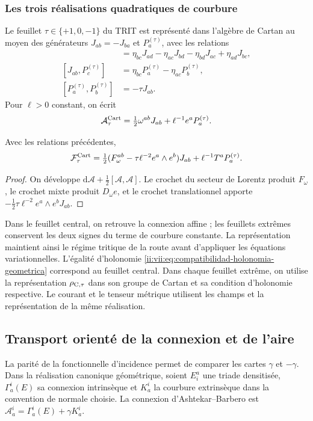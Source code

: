 \subsubsection{Les trois réalisations quadratiques de courbure}

Le feuillet \(\tau\in\{+1,0,-1\}\) du TRIT est représenté dans
l'algèbre de Cartan au moyen des générateurs \(J_{ab}=-J_{ba}\)
et \(P_a^{(\tau)}\), avec les relations
\begin{align*}
 [J_{ab},J_{cd}]&=
 \eta_{bc}J_{ad}-\eta_{ac}J_{bd}
 -\eta_{bd}J_{ac}+\eta_{ad}J_{bc},\\
 [J_{ab},P_c^{(\tau)}]&=
 \eta_{bc}P_a^{(\tau)}-\eta_{ac}P_b^{(\tau)},\\
 [P_a^{(\tau)},P_b^{(\tau)}]&=-\tau J_{ab}.
\end{align*}
Pour \(\ell>0\) constant, on écrit
\[
 \mathcal A_\tau^{\rm Cart}
 =\tfrac12\omega^{ab}J_{ab}+\ell^{-1}e^aP_a^{(\tau)}.
\]

\begin{proposition}
\label{ii:vii:prop:curvatura-tritificada}
Avec les relations précédentes,
\begin{equation}
 \mathcal F_\tau^{\rm Cart}
 =\tfrac12(F_\omega^{ab}-\tau\ell^{-2}e^a\wedge e^b)J_{ab}
     +\ell^{-1}T^aP_a^{(\tau)}.
 \label{ii:vii:eq:curvatura-tritificada}
\end{equation}
\end{proposition}
\begin{proof}
On développe \(\mathrm d\mathcal A+\tfrac12[\mathcal A,\mathcal A]\). Le crochet du secteur de Lorentz produit \(F_\omega\), le crochet mixte produit \(D_\omega e\), et le crochet translationnel apporte \(-\tfrac12\tau\ell^{-2}e^a\wedge e^bJ_{ab}\).
\end{proof}

Dans le feuillet central, on retrouve la connexion affine ; les feuillets extrêmes
conservent les deux signes du terme de courbure constante. La
représentation maintient ainsi le régime tritique de la route avant
d'appliquer les équations variationnelles. L'égalité d'holonomie
\eqref{ii:vii:eq:compatibilidad-holonomia-geometrica} correspond au
feuillet central. Dans chaque feuillet extrême, on utilise la représentation
\(\rho_{{\rm C},\tau}\) dans son groupe de Cartan et sa condition
d'holonomie respective. Le courant et le tenseur métrique utilisent
les champs et la représentation de la même réalisation.



\subsection{Transport orienté de la connexion et de l'aire}
\label{ii:sec:ii-costura-barbero}
La parité de la fonctionnelle d'incidence permet de comparer les cartes
\(\gamma\) et \(-\gamma\). Dans la réalisation canonique géométrique,
soient \(E^a_i\) une triade densitisée, \(\Gamma_a^i(E)\) sa
connexion intrinsèque et \(K_a^i\) la courbure extrinsèque dans la
convention de normale choisie. La connexion d'Ashtekar--Barbero est
\(\mathcal A_a^i=\Gamma_a^i(E)+\gamma K_a^i\).

